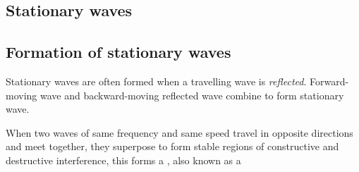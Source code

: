

\newpage




\subsection{Stationary waves}

\subsection{Formation of stationary waves}

Stationary waves are often formed when a travelling wave is \emph{reflected}. Forward-moving wave and backward-moving reflected wave combine to form stationary wave.

\begin{ilight}
	When two waves of same frequency and same speed travel in opposite directions and meet together, they superpose to form stable regions of constructive and destructive interference, this forms a , also known as a 
\end{ilight}


